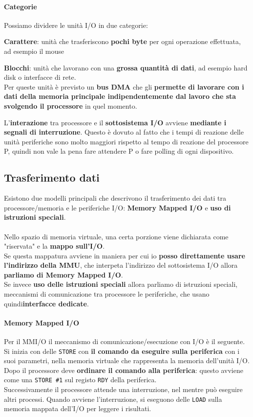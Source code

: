 \documentclass[10pt]{report}
\begin{document}
\paragraph{Categorie} Possiamo dividere le unità I/O in due categorie:
\begin{list}{}{}
	\item \textbf{Carattere}: unità che trasferiscono \textbf{pochi byte} per ogni operazione effettuata, ad esempio il mouse
	\item \textbf{Blocchi}: unità che lavorano con una \textbf{grossa quantità di dati}, ad esempio hard disk o interfacce di rete.\\
	Per queste unità è previsto un \textbf{bus DMA} che gli \textbf{permette di lavorare con i dati della memoria principale indipendentemente dal lavoro che sta svolgendo il processore} in quel momento.
\end{list}
L'\textbf{interazione} tra processore e il \textbf{sottosistema I/O} avviene \textbf{mediante i segnali di interruzione}. Questo è dovuto al fatto che i tempi di reazione delle unità periferiche sono molto maggiori rispetto al tempo di reazione del processore P, quindi non vale la pena fare attendere P o fare polling di ogni dispositivo.
\subsection{Trasferimento dati}
Esistono due modelli principali che descrivono il trasferimento dei dati tra processore/memoria e le periferiche I/O: \textbf{Memory Mapped I/O} e \textbf{uso di istruzioni speciali}.\\\\
Nello spazio di memoria virtuale, una certa porzione viene dichiarata come "riservata" e la \textbf{mappo sull'I/O}.\\
Se questa mappatura avviene in maniera per cui io \textbf{posso direttamente usare l'indirizzo della MMU}, che interpeta l'indirizzo del sottosistema I/O allora \textbf{parliamo di Memory Mapped I/O}.\\
Se invece \textbf{uso delle istruzioni speciali} allora parliamo di istruzioni speciali, meccanismi di comunicazione tra processore le periferiche, che usano quindi\textbf{interfacce dedicate}.
\paragraph{Memory Mapped I/O} Per il MMI/O il meccanismo di comunicazione/esecuzione con I/O è il seguente.\\
Si inizia con delle \texttt{STORE} con \textbf{il comando da eseguire sulla periferica} con i suoi parametri, nella memoria virtuale che rappresenta la memoria dell'unità I/O.\\
Dopo il processore deve \textbf{ordinare il comando alla periferica}: questo avviene come una \texttt{STORE \#1} sul registo \texttt{RDY} della periferica.\\
Successivamente il processore attende una interruzione, nel mentre può eseguire altri processi. Quando avviene l'interruzione, si eseguono delle \texttt{LOAD} sulla memoria mappata dell'I/O per leggere i risultati.
\end{document}
